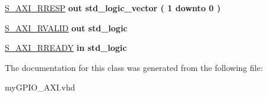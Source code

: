 \begin{DoxyCompactItemize}
\item 
\hypertarget{classmy_g_p_i_o___a_x_i_ga67ba85504b4c51fb0eb00d18fd70ad92}{\hyperlink{group__my_g_p_i_o_ga67ba85504b4c51fb0eb00d18fd70ad92}{S\+\_\+\+A\+X\+I\+\_\+\+R\+R\+E\+S\+P}  {\bfseries {\bfseries \textcolor{vhdlchar}{out}\textcolor{vhdlchar}{ }}} {\bfseries \textcolor{vhdlchar}{std\+\_\+logic\+\_\+vector}\textcolor{vhdlchar}{ }\textcolor{vhdlchar}{(}\textcolor{vhdlchar}{ }\textcolor{vhdlchar}{ } \textcolor{vhdldigit}{1} \textcolor{vhdlchar}{ }\textcolor{vhdlchar}{downto}\textcolor{vhdlchar}{ }\textcolor{vhdlchar}{ } \textcolor{vhdldigit}{0} \textcolor{vhdlchar}{ }\textcolor{vhdlchar}{)}\textcolor{vhdlchar}{ }} }\label{classmy_g_p_i_o___a_x_i_ga67ba85504b4c51fb0eb00d18fd70ad92}

\item 
\hypertarget{classmy_g_p_i_o___a_x_i_ga31f4e92d27c2c2005ee5f368a8249604}{\hyperlink{group__my_g_p_i_o_ga31f4e92d27c2c2005ee5f368a8249604}{S\+\_\+\+A\+X\+I\+\_\+\+R\+V\+A\+L\+I\+D}  {\bfseries {\bfseries \textcolor{vhdlchar}{out}\textcolor{vhdlchar}{ }}} {\bfseries \textcolor{vhdlchar}{std\+\_\+logic}\textcolor{vhdlchar}{ }} }\label{classmy_g_p_i_o___a_x_i_ga31f4e92d27c2c2005ee5f368a8249604}

\item 
\hypertarget{classmy_g_p_i_o___a_x_i_ga5850bf8f42acdf01938057507dc703b7}{\hyperlink{group__my_g_p_i_o_ga5850bf8f42acdf01938057507dc703b7}{S\+\_\+\+A\+X\+I\+\_\+\+R\+R\+E\+A\+D\+Y}  {\bfseries {\bfseries \textcolor{vhdlchar}{in}\textcolor{vhdlchar}{ }}} {\bfseries \textcolor{vhdlchar}{std\+\_\+logic}\textcolor{vhdlchar}{ }} }\label{classmy_g_p_i_o___a_x_i_ga5850bf8f42acdf01938057507dc703b7}

\end{DoxyCompactItemize}


The documentation for this class was generated from the following file\+:\begin{DoxyCompactItemize}
\item 
my\+G\+P\+I\+O\+\_\+\+A\+X\+I.\+vhd\end{DoxyCompactItemize}
